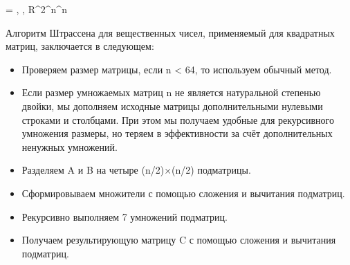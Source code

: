 \documentclass{report}
\begin{document}
    {\displaystyle {} =  \qquad {} , , \in R^{2^{n}^{n}}}

Алгоритм Штрассена для вещественных чисел, применяемый для квадратных матриц, заключается в следующем:
\begin{itemize}
    \item Проверяем размер матрицы, если n < 64, то используем обычный метод.
    \item Если размер умножаемых матриц n не является натуральной степенью двойки, мы дополняем исходные матрицы дополнительными нулевыми строками и столбцами. При этом мы получаем удобные для рекурсивного умножения размеры, но теряем в эффективности за счёт дополнительных ненужных умножений.
    \item Разделяем A и B на четыре (n/2)×(n/2) подматрицы.
    \item Сформировываем множители с помощью сложения и вычитания подматриц.
    \item Рекурсивно выполняем 7 умножений подматриц.
    \item Получаем результирующую матрицу C с помощью сложения и вычитания подматриц.
\end{itemize}
\newpage

\end{document}
